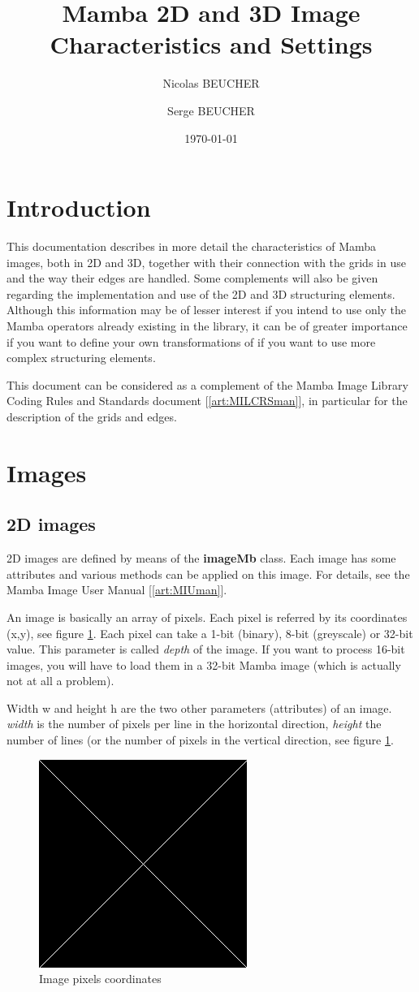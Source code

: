 \documentclass[a4paper,10pt,oneside]{article}
\title{Mamba 2D and 3D Image Characteristics and Settings}
\author{Nicolas BEUCHER \and Serge BEUCHER}
\date{\today}
\begin{document}
\mambaCover
\mambaContent
\mambaFigures

\section{Introduction}
This documentation describes in more detail the characteristics of Mamba images, both in
2D and 3D, together with their connection with the grids in use and the way their edges are handled.
Some complements will also be given regarding the implementation and use of the 2D and 3D
structuring elements. Although this information may be of lesser interest if you intend to use
only the Mamba operators already existing in the library, it can be of greater importance if you
want to define your own transformations of if you want to use more complex structuring elements.

This document can be considered as a complement of the Mamba Image Library Coding Rules and Standards
document [\ref{art:MILCRSman}], in particular for the description of the grids and edges.

\section{Images}
\subsection{2D images}
2D images are defined by means of the \textbf{imageMb} class. Each image has some attributes and
various methods can be applied on this image. For details, see the Mamba Image User Manual [\ref{art:MIUman}].

An image is basically an array of pixels. Each pixel is referred by its coordinates (x,y), see
figure \ref{fig:image_coord}. Each pixel can take a 1-bit (binary), 8-bit (greyscale) or 32-bit value.
This parameter is called \textit{depth} of the image. If you want to process 16-bit images, you will have to
load them in a 32-bit Mamba image (which is actually not at all a problem).

Width w and height h are the two other parameters (attributes) of an image. \textit{width} is the number of
pixels per line in the horizontal direction, \textit{height} the number of lines (or the number of pixels in
the vertical direction, see figure \ref{fig:image_coord}.

\begin{figure}
\centering
\includegraphics[scale=0.3]{figures/xxx.png}
\caption{Image pixels coordinates}
\label{fig:image_coord}
\end{figure}
\end{document}
